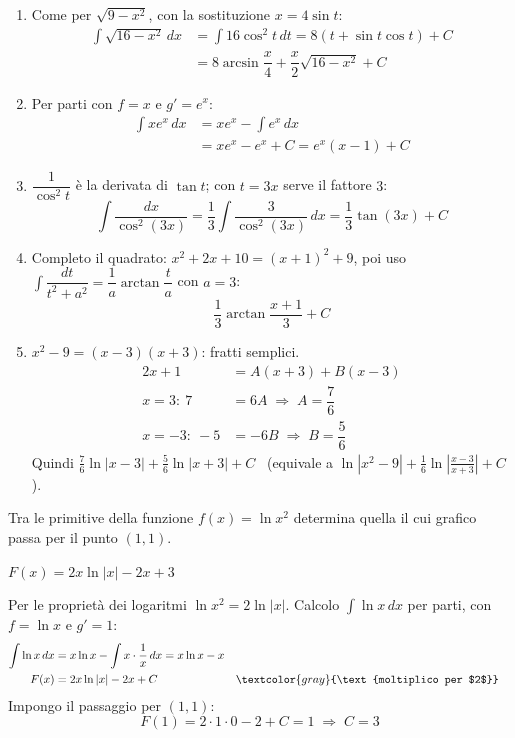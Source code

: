 \begin{question}[ID=1.2, subtitle={Integrali indefiniti — serie 2}, tags={integrali, indefiniti}, difficulty=media]
\begin{explanation}
\begin{enumerate}
    \[ \int\dfrac{1/x}{\ln x}\,dx=\ln|\ln x|+C \]
    \item Come per $\sqrt{9-x^2}$, con la sostituzione $x=4\sin t$:
    \[\begin{aligned}
    \int\sqrt{16-x^2}\,dx &= \int16\cos^2t\,dt=8(t+\sin t\cos t)+C\\
    &= 8\arcsin\dfrac x4+\dfrac x2\sqrt{16-x^2}+C
    \end{aligned}\]
    \item Per parti con $f=x$ e $g'=e^x$:
    \[\begin{aligned}
    \int xe^x\,dx &= xe^x-\int e^x\,dx\\
    &= xe^x-e^x+C=e^x(x-1)+C
    \end{aligned}\]
    \item $\dfrac{1}{\cos^2t}$ è la derivata di $\tan t$; con $t=3x$ serve il fattore $3$:
    \[ \int\dfrac{dx}{\cos^2(3x)}=\dfrac13\int\dfrac{3}{\cos^2(3x)}\,dx=\dfrac13\tan(3x)+C \]
    \item Completo il quadrato: $x^2+2x+10=(x+1)^2+9$, poi uso $\int\dfrac{dt}{t^2+a^2}=\dfrac1a\arctan\dfrac ta$ con $a=3$:
    \[ \dfrac13\arctan\dfrac{x+1}{3}+C \]
    \item $x^2-9=(x-3)(x+3)$: fratti semplici.
    \[\begin{aligned}
    2x+1 &= A(x+3)+B(x-3)\\
    x=3:\ 7 &= 6A \;\Rightarrow\; A=\dfrac76\\
    x=-3:\ -5 &= -6B \;\Rightarrow\; B=\dfrac56
    \end{aligned}\]
    Quindi $\tfrac76\ln|x-3|+\tfrac56\ln|x+3|+C$ \ (equivale a $\ln|x^2-9|+\tfrac16\ln\left|\tfrac{x-3}{x+3}\right|+C$).
\end{enumerate}
\end{explanation}
\end{question}





\begin{question}[ID=2.1, subtitle={Primitiva di $f(x)=\ln x^2$ passante per $(1,1)$}, tags={integrali, primitiva}, difficulty=media]
Tra le primitive della funzione $f(x) = \ln x^2$ determina quella il cui grafico passa per il punto $(1,1)$.
\begin{solution}
$F(x)=2x\ln|x|-2x+3$
\end{solution}
\begin{explanation}
Per le proprietà dei logaritmi $\ln x^2=2\ln|x|$. Calcolo $\int\ln x\,dx$ per parti, con $f=\ln x$ e $g'=1$:
\[\begin{aligned}
\int\ln x\,dx &= x\ln x-\int x\cdot\dfrac1x\,dx=x\ln x-x\\
F(x) &= 2x\ln|x|-2x+C && \textcolor{gray}{\text{moltiplico per $2$}}
\end{aligned}\]
Impongo il passaggio per $(1,1)$:
\[ F(1)=2\cdot1\cdot0-2+C=1 \;\Rightarrow\; C=3 \]
\end{explanation}
\end{question}

